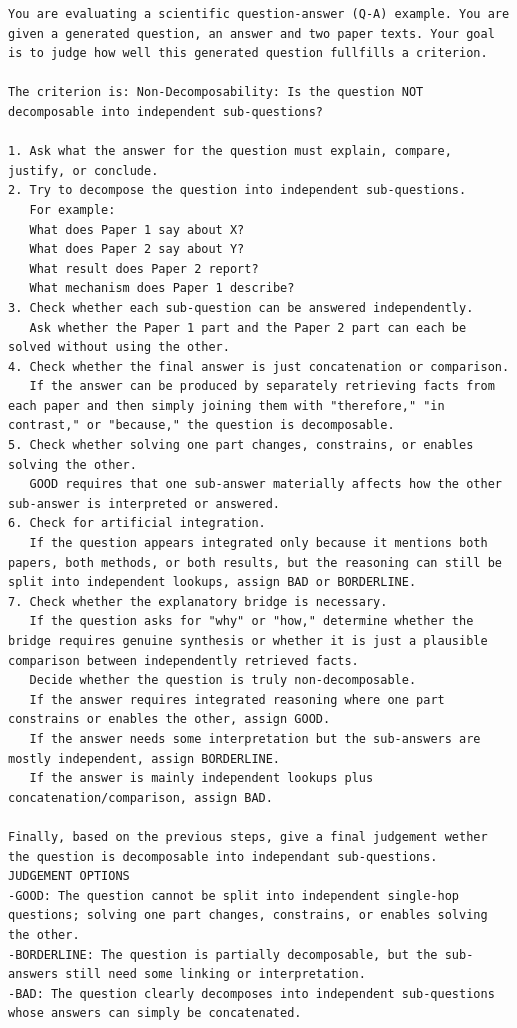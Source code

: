 \begin{lstlisting}[caption={Non-Decomposability Prompt}, label={lst:NonDecomposabilityPrompt}]
    You are evaluating a scientific question-answer (Q-A) example. You are given a generated question, an answer and two paper texts. Your goal is to judge how well this generated question fullfills a criterion.

The criterion is: Non-Decomposability: Is the question NOT decomposable into independent sub-questions?

1. Ask what the answer for the question must explain, compare, justify, or conclude.
2. Try to decompose the question into independent sub-questions.
   For example:
   What does Paper 1 say about X?
   What does Paper 2 say about Y?
   What result does Paper 2 report?
   What mechanism does Paper 1 describe?
3. Check whether each sub-question can be answered independently.
   Ask whether the Paper 1 part and the Paper 2 part can each be solved without using the other.
4. Check whether the final answer is just concatenation or comparison.
   If the answer can be produced by separately retrieving facts from each paper and then simply joining them with "therefore," "in contrast," or "because," the question is decomposable.
5. Check whether solving one part changes, constrains, or enables solving the other.
   GOOD requires that one sub-answer materially affects how the other sub-answer is interpreted or answered.
6. Check for artificial integration.
   If the question appears integrated only because it mentions both papers, both methods, or both results, but the reasoning can still be split into independent lookups, assign BAD or BORDERLINE.
7. Check whether the explanatory bridge is necessary.
   If the question asks for "why" or "how," determine whether the bridge requires genuine synthesis or whether it is just a plausible comparison between independently retrieved facts.
   Decide whether the question is truly non-decomposable.
   If the answer requires integrated reasoning where one part constrains or enables the other, assign GOOD.
   If the answer needs some interpretation but the sub-answers are mostly independent, assign BORDERLINE.
   If the answer is mainly independent lookups plus concatenation/comparison, assign BAD.

Finally, based on the previous steps, give a final judgement wether the question is decomposable into independant sub-questions.
JUDGEMENT OPTIONS
-GOOD: The question cannot be split into independent single-hop questions; solving one part changes, constrains, or enables solving the other.
-BORDERLINE: The question is partially decomposable, but the sub-answers still need some linking or interpretation.
-BAD: The question clearly decomposes into independent sub-questions whose answers can simply be concatenated.


\end{lstlisting}
